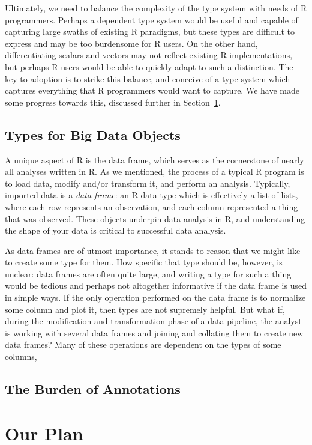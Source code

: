 \documentclass[sigplan,10pt,review,anonymous]{acmart}\settopmatter{printfolios=true,printccs=false,printacmref=false}
\begin{document}
Ultimately, we need to balance the complexity of the type system with needs of R programmers.
Perhaps a dependent type system would be useful and capable of capturing large swaths of existing R paradigms, but these types are difficult to express and may be too burdensome for R users. 
On the other hand, differentiating scalars and vectors may not reflect existing R implementations, but perhaps R users would be able to quickly adapt to such a distinction.
The key to adoption is to strike this balance, and conceive of a type system which captures everything that R programmers would want to capture. 
We have made some progress towards this, discussed further in Section~\ref{sec:plan}.

%
%
\subsection{Types for Big Data Objects}

A unique aspect of R is the data frame, which serves as the cornerstone of nearly all analyses written in R.
As we mentioned, the process of a typical R program is to load data, modify and/or transform it, and perform an analysis.
Typically, imported data is a {\it data frame}: an R data type which is effectively a list of lists, where each row represents an observation, and each column represented a thing that was observed. 
These objects underpin data analysis in R, and understanding the shape of your data is critical to successful data analysis.

As data frames are of utmost importance, it stands to reason that we might like to create some type for them.
How specific that type should be, however, is unclear: data frames are often quite large, and writing a type for such a thing would be tedious and perhaps not altogether informative if the data frame is used in simple ways.
If the only operation performed on the data frame is to normalize some column and plot it, then types are not supremely helpful.
But what if, during the modification and transformation phase of a data pipeline, the analyst is working with several data frames and joining and collating them to create new data frames?
Many of these operations are dependent on the types of some columns,  

%
%
\subsection{The Burden of Annotations}

%
%
%
%
\section{Our Plan}
\label{sec:plan}
\end{document}
